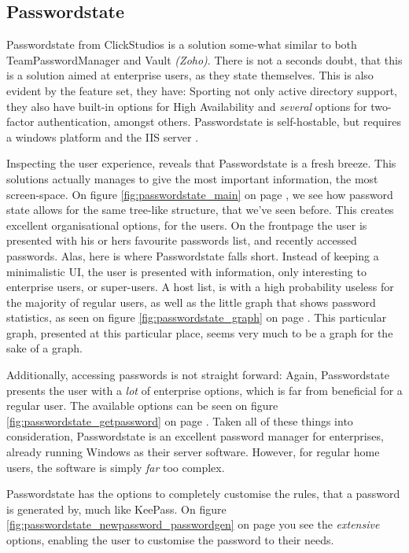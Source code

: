 		\subsection*{Passwordstate}
			Passwordstate from ClickStudios\cite{passwordstate} is a solution some-what similar to both TeamPasswordManager and Vault \emph{(Zoho)}. There is not a seconds doubt, that this is a solution aimed at enterprise users, as they state themselves. This is also evident by the feature set, they have: Sporting not only active directory support, they also have built-in options for High Availability and \emph{several} options for two-factor authentication, amongst others. Passwordstate is self-hostable, but requires a windows platform and the IIS server \cite{passwordstate_requirements}.

			Inspecting the user experience, reveals that Passwordstate is a fresh breeze. This solutions actually manages to give the most important information, the most screen-space. On figure \ref{fig:passwordstate_main} on page \pageref{fig:passwordstate_main}, we see how password state allows for the same tree-like structure, that we've seen before. This creates excellent organisational options, for the users. On the frontpage the user is presented with his or hers favourite passwords list, and recently accessed passwords. Alas, here is where Passwordstate falls short. Instead of keeping a minimalistic UI, the user is presented with information, only interesting to enterprise users, or super-users. A host list, is with a high probability useless for the majority of regular users, as well as the little graph that shows password statistics, as seen on figure \ref{fig:passwordstate_graph} on page \pageref{fig:passwordstate_graph}. This particular graph, presented at this particular place, seems very much to be a graph for the sake of a graph. 

			Additionally, accessing passwords is not straight forward: Again, Passwordstate presents the user with a \emph{lot} of enterprise options, which is far from beneficial for a regular user. The available options can be seen on figure \ref{fig:passwordstate_getpassword} on page \pageref{fig:passwordstate_getpassword}. Taken all of these things into consideration, Passwordstate is an excellent password manager for enterprises, already running Windows as their server software. However, for regular home users, the software is simply \emph{far} too complex.

			Passwordstate has the options to completely customise the rules, that a password is generated by, much like KeePass. On figure \ref{fig:passwordstate_newpassword_passwordgen} on page \pageref{fig:passwordstate_newpassword_passwordgen} you see the \emph{extensive} options, enabling the user to customise the password to their needs.

